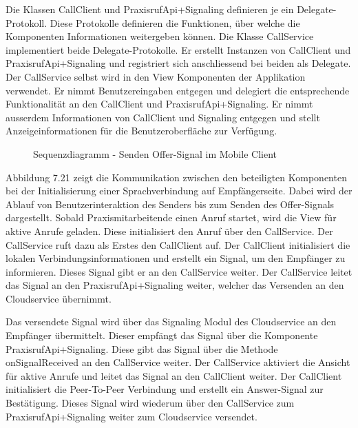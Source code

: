 Die Klassen CallClient und PraxisrufApi+Signaling definieren je ein Delegate-Protokoll.
Diese Protokolle definieren die Funktionen, über welche die Komponenten Informationen weitergeben können.
Die Klasse CallService implementiert beide Delegate-Protokolle.
Er erstellt Instanzen von CallClient und PraxisrufApi+Signaling und registriert sich anschliessend bei beiden als Delegate.
Der CallService selbst wird in den View Komponenten der Applikation verwendet.
Er nimmt Benutzereingaben entgegen und delegiert die entsprechende Funktionalität an den CallClient und PraxisrufApi+Signaling.
Er nimmt ausserdem Informationen von CallClient und Signaling entgegen und stellt Anzeigeinformationen für die Benutzeroberfläche zur Verfügung.

\begin{figure}[h]
    \centering
    \begin{minipage}[b]{0.85\textwidth}
        \caption{Sequenzdiagramm - Senden Offer-Signal im Mobile Client}
    \end{minipage}
\end{figure}

Abbildung 7.21 zeigt die Kommunikation zwischen den beteiligten Komponenten bei der Initialisierung einer Sprachverbindung auf Empfängerseite.
Dabei wird der Ablauf von Benutzerinteraktion des Senders bis zum Senden des Offer-Signals dargestellt.
Sobald Praxismitarbeitende einen Anruf startet, wird die View für aktive Anrufe geladen.
Diese initialisiert den Anruf über den CallService.
Der CallService ruft dazu als Erstes den CallClient auf.
Der CallClient initialisiert die lokalen Verbindungsinformationen und erstellt ein Signal, um den Empfänger zu informieren.
Dieses Signal gibt er an den CallService weiter.
Der CallService leitet das Signal an den PraxisrufApi+Signaling weiter, welcher das Versenden an den Cloudservice übernimmt.

Das versendete Signal wird über das Signaling Modul des Cloudservice an den Empfänger übermittelt.
Dieser empfängt das Signal über die Komponente PraxisrufApi+Signaling.
Diese gibt das Signal über die Methode onSignalReceived an den CallService weiter.
Der CallService aktiviert die Ansicht für aktive Anrufe und leitet das Signal an den CallClient weiter.
Der CallClient initialisiert die Peer-To-Peer Verbindung und erstellt ein Answer-Signal zur Bestätigung.
Dieses Signal wird wiederum über den CallService zum PraxisrufApi+Signaling weiter zum Cloudservice versendet.

\clearpage
